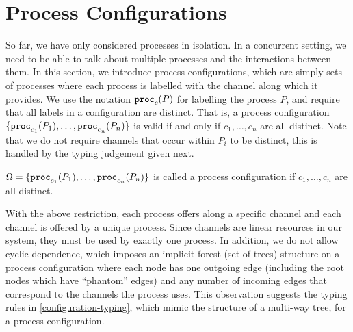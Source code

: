 
\section{Process Configurations}
\label{chapter/session-types/configurations}

So far, we have only considered processes in isolation. In a concurrent setting, we need to be able to talk about multiple processes and the interactions between them. In this section, we introduce process configurations, which are simply sets of processes where each process is labelled with the channel along which it provides. We use the notation $\mathtt{proc}_{c}(P)$ for labelling the process $P$, and require that all labels in a configuration are distinct. That is, a process configuration $\lbrace\mathtt{proc}_{c_1}(P_1), \ldots, \mathtt{proc}_{c_n}(P_n)\rbrace$ is valid if and only if $c_1, \ldots, c_n$ are all distinct. Note that we do not require channels that occur within $P_i$ to be distinct, this is handled by the typing judgement given next.

\begin{definition}
  $\Omega = \lbrace\mathtt{proc}_{c_1}(P_1), \ldots, \mathtt{proc}_{c_n}(P_n)\rbrace$ is called a process configuration if $c_1, \ldots, c_n$ are all distinct.
\end{definition}

With the above restriction, each process offers along a specific channel and each channel is offered by a unique process. Since channels are linear resources in our system, they must be used by exactly one process. In addition, we do not allow cyclic dependence, which imposes an implicit forest (set of trees) structure on a process configuration where each node has one outgoing edge (including the root nodes which have ``phantom'' edges) and any number of incoming edges that correspond to the channels the process uses. This observation suggests the typing rules in \cref{configuration-typing}, which mimic the structure of a multi-way tree, for a process configuration.


